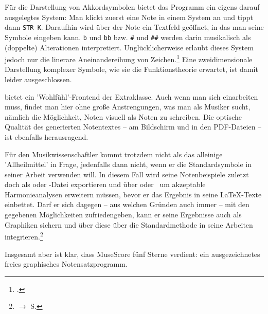 Für die Darstellung von Akkordsymbolen bietet das Programm ein eigens darauf
ausgelegtes System: Man klickt zuerst eine Note in einem System an und tippt
dann \texttt{STR K}. Daraufhin wird über der Note ein Textfeld geöffnet, in das
man seine Symbole eingeben kann. \texttt{b} und \texttt{bb} bzw. \texttt{\#} und
\texttt{\#\#} werden darin musikalisch als (doppelte) Alterationen
interpretiert. Unglücklicherweise erlaubt dieses System jedoch nur die linerare
Aneinandereihung von Zeichen.\footcite[vgl.][\nopage wp.]{MuseScore2019i} Eine
zweidimensionale Darstellung komplexer Symbole, wie sie die Funktionstheorie
erwartet, ist damit leider ausgeschlossen.

 bietet ein 'Wohlfühl'-Frontend der Extraklasse. Auch wenn man
sich einarbeiten muss, findet man hier ohne große Anstrengungen, was man als
Musiker sucht, nämlich die Möglichkeit, Noten visuell als Noten zu schreiben.
Die optische Qualität des generierten Notentextes -- am Bildschirm und in den
PDF-Dateien -- ist ebenfalls herausragend. 

Für den Musikwissenschaftler kommt  trotzdem nicht als das
alleinige 'Allheilmittel' in Frage, jedenfalls dann nicht, wenn er die
Standardsymbole in seiner Arbeit verwenden will. In diesem Fall  wird seine
Notenbeispiele zuletzt doch als  oder -Datei
exportieren und über  oder  \ um akzeptable
Harmonieanalysen erweitern müssen, bevor er das Ergebnis in seine \LaTeX-Texte
einbettet. Darf er sich dagegen -- aus welchen Gründen auch immer -- mit den
gegebenen Möglichkeiten zufriedengeben, kann er seine Ergebnisse auch als
Graphiken sichern und über diese über die Standardmethode in seine Arbeiten
integrieren.\footnote{$\rightarrow$ S. \pageref{IncludeGraphics}}

Insgesamt aber ist klar, dass MuseScore fünf Sterne verdient: ein
ausgezeichnetes freies graphisches Notensatzprogramm.
%
